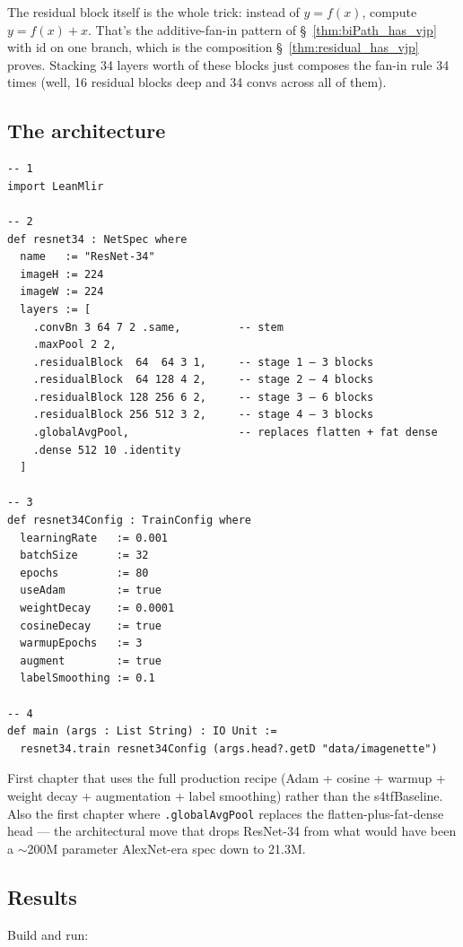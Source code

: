 The residual block itself is the whole trick: instead of $y = f(x)$,
compute $y = f(x) + x$. That's the additive-fan-in pattern of
\S~\ref{thm:biPath_has_vjp} with $\mathrm{id}$ on one branch, which
is the composition \S~\ref{thm:residual_has_vjp} proves. Stacking 34
layers worth of these blocks just composes the fan-in rule 34 times
(well, 16 residual blocks deep and 34 convs across all of them).

\subsection*{The architecture}

\begin{verbatim}
-- 1
import LeanMlir

-- 2
def resnet34 : NetSpec where
  name   := "ResNet-34"
  imageH := 224
  imageW := 224
  layers := [
    .convBn 3 64 7 2 .same,         -- stem
    .maxPool 2 2,
    .residualBlock  64  64 3 1,     -- stage 1 — 3 blocks
    .residualBlock  64 128 4 2,     -- stage 2 — 4 blocks
    .residualBlock 128 256 6 2,     -- stage 3 — 6 blocks
    .residualBlock 256 512 3 2,     -- stage 4 — 3 blocks
    .globalAvgPool,                 -- replaces flatten + fat dense
    .dense 512 10 .identity
  ]

-- 3
def resnet34Config : TrainConfig where
  learningRate   := 0.001
  batchSize      := 32
  epochs         := 80
  useAdam        := true
  weightDecay    := 0.0001
  cosineDecay    := true
  warmupEpochs   := 3
  augment        := true
  labelSmoothing := 0.1

-- 4
def main (args : List String) : IO Unit :=
  resnet34.train resnet34Config (args.head?.getD "data/imagenette")
\end{verbatim}

First chapter that uses the full production recipe (Adam + cosine
+ warmup + weight decay + augmentation + label smoothing) rather
than the s4tfBaseline. Also the first chapter where
\texttt{.globalAvgPool} replaces the flatten-plus-fat-dense head --- the
architectural move that drops ResNet-34 from what would have been a
$\sim$200M parameter AlexNet-era spec down to 21.3M.

\subsection*{Results}

Build and run:

